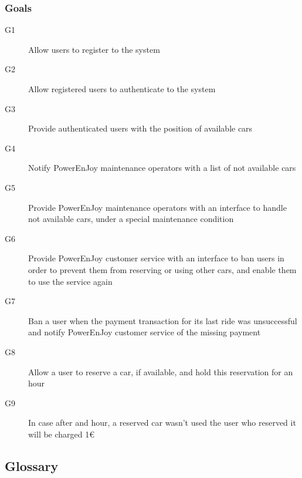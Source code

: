 	\subsubsection{Goals}
	\begin{description}
		\item[G1] Allow users to register to the system
		\item[G2] Allow registered users to authenticate to the system
		\item[G3] Provide authenticated users with the position of available cars
		\item[G4] Notify PowerEnJoy maintenance operators with a list of not available cars 
		\item[G5] Provide PowerEnJoy maintenance operators with an interface to handle not available cars, under a special maintenance condition 
		\item[G6] Provide PowerEnJoy customer service with an interface to ban users in order to prevent them from reserving or using other cars, and enable them to use the service again
		\item[G7] Ban a user when the payment transaction for its last ride was unsuccessful and notify PowerEnJoy customer service of the missing payment
		\item[G8] Allow a user to reserve a car, if available, and hold this reservation for an hour
		\item[G9] In case after and hour, a reserved car wasn't used the user who reserved it will be charged 1\euro
	\end{description}

\subsection{Glossary}
